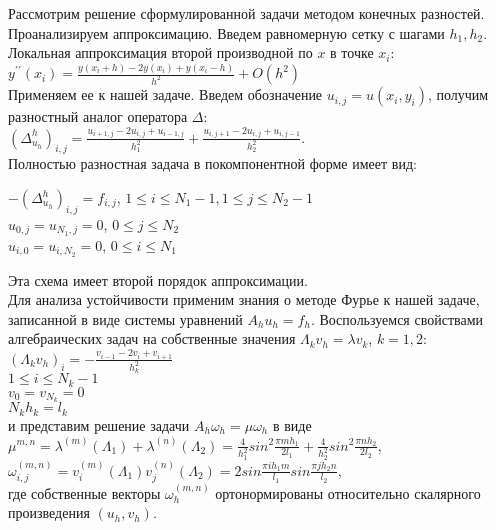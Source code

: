 \documentclass[specialist, subf, href, colorlinks=true, 12pt, times, mtpro, final]{disser}
\theoremstyle{definition}
\begin{document}
{    Рассмотрим решение сформулированной задачи методом конечных разностей. Проанализируем аппроксимацию. Введем равномерную сетку с шагами $h_1, h_2$.\\
    Локальная аппроксимация второй производной по $x$ в точке $x_i$: \\
    $y^{\prime\prime}(x_i)=\frac{y(x_i+h)-2y(x_i)+y(x_i-h)}{h^2} + O(h^2)$\\
    Применяем ее к нашей задаче. Введем обозначение $u_{i,j} = u(x_i,y_i)$, получим разностный аналог оператора $\Delta$:\\
    $(\Delta^h_{u_h})_{i,j} = \frac{u_{i+1,j}-2u_{i,j}+u_{i-1,j}}{h^2_1} + \frac{u_{i,j+1}-2u_{i,j}+u_{i,j-1}}{h^2_2}$.\\
    Полностью разностная задача в покомпонентной форме имеет вид:\\
    \begin{center}
    	$-(\Delta^h_{u_h})_{i,j} = f_{i,j}$,  $1\leqslant i \leqslant N_1 - 1, 1 \leqslant j \leqslant N_2 -1$\\
    	$u_{0,j} = u_{N_1,j}=0$,  $0\leqslant j \leqslant N_2$\\
    	$u_{i,0} = u_{i,N_2}=0$,  $0\leqslant i \leqslant N_1$\\
    \end{center}
    
    Эта схема имеет второй порядок аппроксимации.\\
    Для анализа устойчивости применим знания о методе Фурье к  нашей задаче, записанной в виде системы уравнений $A_hu_h=f_h$. Воспользуемся свойствами алгебраических задач на собственные значения $\Lambda_kv_h = \lambda v_k$, $k = 1, 2$:\\
    $(\Lambda_kv_h)_i = -\frac{v_{i-1}-2v_i+v_{i+1}}{h^2_k}$\\
    $1 \leqslant i \leqslant N_k -1$\\
    $v_0 = v_{N_k}=0$\\
    $N_kh_k=l_k$\\
    
    и представим решение задачи $A_h\omega_h=\mu \omega_h$ в виде \\
    $\mu^{m,n}=\lambda^{(m)}(\Lambda_1)+\lambda^{(n)}(\Lambda_2) = \frac{4}{h^2_1}sin^2\frac{\pi m h_1}{2l_1} + \frac{4}{h_2^2}sin^2\frac{\pi n h_2}{2l_2}$,\\
    $\omega_{i,j}^{(m,n)} = v_i^{(m)}(\Lambda_1)v_j^{(n)}(\Lambda_2) = 2sin\frac{\pi i h_1 m}{l_1}sin\frac{\pi j h_2 n}{l_2}$,\\
    где собственные векторы $\omega_h^{(m,n)}$ ортонормированы относительно скалярного произведения $(u_h,v_h)$.\\
    
}
\end{document}
